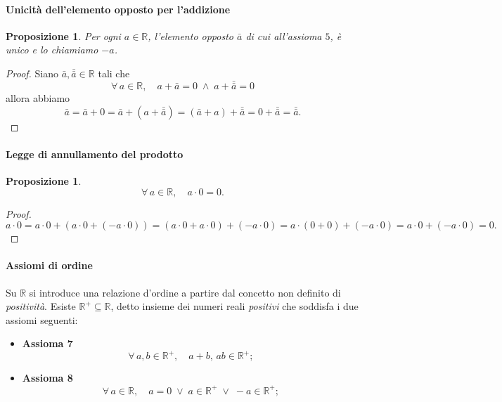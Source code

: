 \documentclass{article}
\theoremstyle{plain}
\newtheorem{prop}[thm]{Proposizione}
\theoremstyle{definition}
\theoremstyle{remark}
\begin{document}
\vspace{10pt}

\paragraph{Unicità dell'elemento opposto per l'addizione}
\begin{bxthm}
\begin{prop}
    Per ogni $a\in\mathbb{R}$, l'elemento opposto $\bar{a}$ di cui all'assioma $5$, è unico e lo chiamiamo $-a$.
\end{prop}
\end{bxthm}
\begin{proof}
    Siano $\bar{a},\bar{\bar{a}}\in\mathbb{R}$ tali che 
    \[\forall\,a\in\mathbb{R},\quad a+\bar{a}=0\;\land\;a+\bar{\bar{a}}=0\]
    allora abbiamo 
    \[\bar{a}=\bar{a}+0=\bar{a}+(a+\bar{\bar{a}})=(\bar{a}+a)+\bar{\bar{a}}=0+\bar{\bar{a}}=\bar{\bar{a}}.\]
\end{proof}

\vspace{10pt}

\paragraph{Legge di annullamento del prodotto}
\begin{bxthm}
\begin{prop}
    \[\forall\,a\in\mathbb{R},\quad a\cdot0=0.\]
\end{prop}
\end{bxthm}
\begin{proof}
    \[a\cdot0=a\cdot0 + (a\cdot0+(-a\cdot0))=(a\cdot0 + a\cdot0)+(-a\cdot0)=a\cdot(0 + 0)+(-a\cdot0)=a\cdot0+(-a\cdot0)=0.\]
\end{proof}

\vspace{10pt}
\paragraph{Assiomi di ordine}
\vspace{10pt}

Su $\mathbb{R}$ si introduce una relazione d'ordine a partire dal concetto non definito di \textit{positività}.
Esiste $\mathbb{R}^+\subseteq\mathbb{R}$, detto insieme dei numeri reali \textit{positivi} che soddisfa i due assiomi seguenti:

\vspace{10pt}

\begin{itemize}
    \item[] \textbf{Assioma 7}
    \[\forall\,a,b\in\mathbb{R}^+,\quad a+b,\,ab\in\mathbb{R^+};\] 
    \item[] \textbf{Assioma 8}
    \[\forall\,a\in\mathbb{R},\quad a=0\;\lor\;a\in\mathbb{R}^+\;\lor\;-a\in\mathbb{R}^+;\]
\end{itemize}
\end{document}
